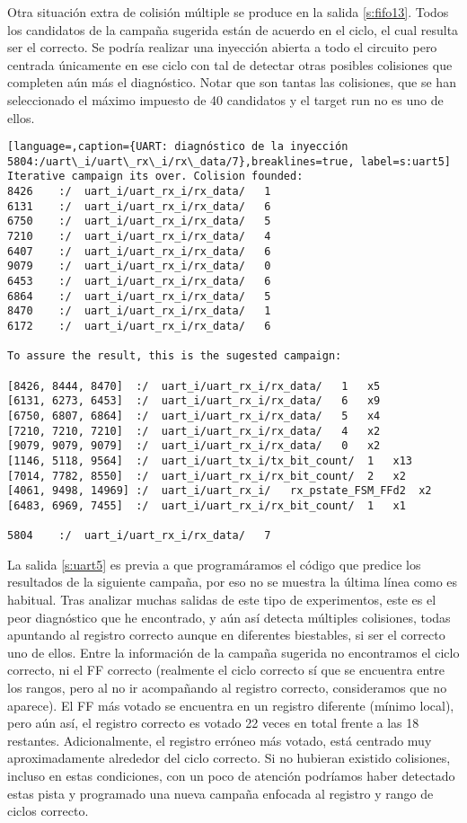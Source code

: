 Otra situación extra de colisión múltiple se produce en la salida \ref{s:fifo13}.
Todos los candidatos de la campaña sugerida están de acuerdo en el ciclo, el cual
resulta ser el correcto. Se podría realizar una inyección abierta a todo el 
circuito pero centrada únicamente en ese ciclo con tal de detectar otras posibles
colisiones que completen aún más el diagnóstico. Notar que son tantas las
colisiones, que se han seleccionado el máximo impuesto de 40 candidatos y el
target run no es uno de ellos.

\begin{lstlisting}[language=,caption={UART: diagnóstico de la inyección
5804:/uart\_i/uart\_rx\_i/rx\_data/7},breaklines=true, label=s:uart5]
Iterative campaign its over. Colision founded:
8426	:/	uart_i/uart_rx_i/rx_data/	1
6131	:/	uart_i/uart_rx_i/rx_data/	6
6750	:/	uart_i/uart_rx_i/rx_data/	5
7210	:/	uart_i/uart_rx_i/rx_data/	4
6407	:/	uart_i/uart_rx_i/rx_data/	6
9079	:/	uart_i/uart_rx_i/rx_data/	0
6453	:/	uart_i/uart_rx_i/rx_data/	6
6864	:/	uart_i/uart_rx_i/rx_data/	5
8470	:/	uart_i/uart_rx_i/rx_data/	1
6172	:/	uart_i/uart_rx_i/rx_data/	6

To assure the result, this is the sugested campaign:

[8426, 8444, 8470]	:/	uart_i/uart_rx_i/rx_data/	1	x5
[6131, 6273, 6453]	:/	uart_i/uart_rx_i/rx_data/	6	x9
[6750, 6807, 6864]	:/	uart_i/uart_rx_i/rx_data/	5	x4
[7210, 7210, 7210]	:/	uart_i/uart_rx_i/rx_data/	4	x2
[9079, 9079, 9079]	:/	uart_i/uart_rx_i/rx_data/	0	x2
[1146, 5118, 9564]	:/	uart_i/uart_tx_i/tx_bit_count/	1	x13
[7014, 7782, 8550]	:/	uart_i/uart_rx_i/rx_bit_count/	2	x2
[4061, 9498, 14969]	:/	uart_i/uart_rx_i/	rx_pstate_FSM_FFd2	x2
[6483, 6969, 7455]	:/	uart_i/uart_rx_i/rx_bit_count/	1	x1

5804	:/	uart_i/uart_rx_i/rx_data/	7
\end{lstlisting}

La salida \ref{s:uart5} es previa a que programáramos el código que predice los
resultados de la siguiente campaña, por eso no se muestra la última línea como es
habitual. Tras analizar muchas salidas de este tipo de experimentos, este es el 
peor diagnóstico que he encontrado, y aún así detecta múltiples colisiones, 
todas apuntando al registro correcto aunque en diferentes biestables, si ser el
correcto uno de ellos. Entre la información de la campaña sugerida no encontramos 
el ciclo correcto, ni el \gls{FF} correcto (realmente el ciclo correcto sí que se
encuentra entre los rangos, pero al no ir acompañando al registro correcto,
consideramos que no aparece). El \gls{FF} más votado se encuentra en un registro 
diferente (mínimo local), pero aún así, el registro correcto es votado 22 veces en
total frente a las 18 restantes. Adicionalmente, el registro erróneo más votado, 
está centrado muy aproximadamente alrededor del ciclo correcto. Si no hubieran 
existido colisiones, incluso en estas condiciones, con un poco de atención
podríamos haber detectado estas pista y programado una nueva campaña enfocada al
registro y rango de ciclos correcto.

